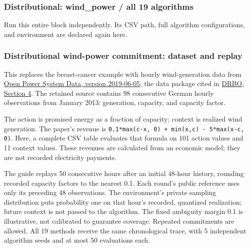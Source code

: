 \documentclass[10pt,a4paper]{article}
\begin{document}
\subsubsection*{Distributional: wind\_\allowbreak{}power / all 19 algorithms}

Run this entire block independently. Its CSV path,\allowbreak{} full algorithm configurations,\allowbreak{} and environment are declared again here.



\subsubsection*{Distributional wind-power commitment: dataset and replay}

This replaces the breast-cancer example with hourly wind-generation data from \href{https://data.open-power-system-data.org/time_series/2019-06-05/}{Open Power System Data,\allowbreak{} version 2019-06-05},\allowbreak{} the data package cited in \href{https://proceedings.mlr.press/v108/kirschner20a/kirschner20a.pdf}{DRBO,\allowbreak{} Section 4}. The retained source contains 98 consecutive German hourly observations from January 2013: generation,\allowbreak{} capacity,\allowbreak{} and capacity factor.


The action is promised energy as a fraction of capacity; context is realized wind generation. The paper's revenue is \texttt{0.1*max(c-x,\allowbreak{} 0) + min(x,\allowbreak{}c) - 5*max(x-c,\allowbreak{} 0)}. Here,\allowbreak{} a complete CSV table evaluates that formula on 101 action values and 11 context values. These revenues are calculated from an economic model; they are not recorded electricity payments.


The guide replays 50 consecutive hours after an initial 48-hour history,\allowbreak{} rounding recorded capacity factors to the nearest 0.1. Each round's public reference uses only its preceding 48 observations. The environment's private sampling distribution puts probability one on that hour's recorded,\allowbreak{} quantized realization; future context is not passed to the algorithm. The fixed ambiguity margin 0.1 is illustrative,\allowbreak{} not calibrated to guarantee coverage. Repeated commitments are allowed. All 19 methods receive the same chronological trace,\allowbreak{} with 5 independent algorithm seeds and at most 50 evaluations each.
\end{document}
